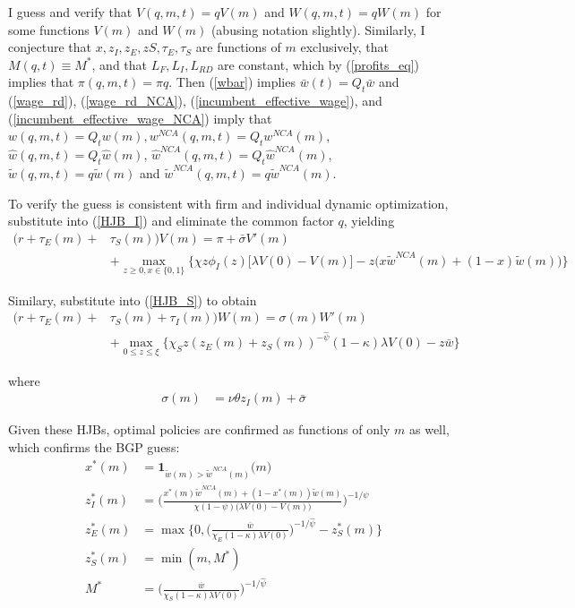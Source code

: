 \documentclass[12pt,english]{article}
\theoremstyle{remark}
\begin{document}
I guess and verify that $V(q,m,t) = q V(m)$ and $W(q,m,t) = qW(m)$ for some functions $V(m)$ and $W(m)$ (abusing notation slightly). Similarly, I conjecture that $x,z_I,z_E,zS,\tau_E,\tau_S$ are functions of $m$ exclusively, that $M(q,t) \equiv M^*$, and that $L_F,L_I,L_{RD}$ are constant, which by (\ref{profits_eq}) implies that $\pi(q,m,t) = \pi q$. Then (\ref{wbar}) implies $\bar{w}(t) = Q_t \bar{w}$ and (\ref{wage_rd}), (\ref{wage_rd_NCA}), (\ref{incumbent_effective_wage}), and (\ref{incumbent_effective_wage_NCA}) imply that $w(q,m,t) = Q_t w(m),w^{NCA}(q,m,t) = Q_tw^{NCA}(m)$, $\hat{w}(q,m,t) = Q_t \hat{w}(m)$, $\hat{w}^{NCA}(q,m,t) = Q_t \hat{w}^{NCA}(m)$, $\tilde{w}(q,m,t) = q \tilde{w}(m)$ and $\tilde{w}^{NCA}(q,m,t) = q\tilde{w}^{NCA}(m)$.

To verify the guess is consistent with firm and individual dynamic optimization, substitute into (\ref{HJB_I}) and eliminate the common factor $q$, yielding
\begin{align}
(r + \tau_E(m) + &\tau_S(m)) V(m) = \pi + \bar{\sigma}V'(m) \nonumber \\
&+ \max_{z \ge 0, x \in \{0,1\}} \Big\{  \chi z \phi_I(z) \Big[\lambda V(0) - V(m) \Big] - z \Big(x \tilde{w}^{NCA}(m) + (1-x) \tilde{w}(m) \Big) \Big\} \label{BGP_HJB_I}
\end{align} 

Similary, substitute into (\ref{HJB_S}) to obtain
\begin{align}
(r + \tau_E(m) + &\tau_S(m) + \tau_I(m))W(m) = \sigma(m) W'(m) \nonumber \\
&+ \max_{0 \le z \le \xi} \Big\{  \chi_S z (z_E(m) + z_S(m))^{-\hat{\psi}} (1-\kappa) \lambda V(0) - z \bar{w} \Big\} \label{BGP_HJB_S} 
\end{align}

where
\begin{align}
\sigma(m) &= \nu \theta z_I(m) + \bar{\sigma} 
\end{align}

Given these HJBs, optimal policies are confirmed as functions of only $m$ as well, which confirms the BGP guess:
\begin{align}
x^*(m) &= \textbf{1}_{\tilde{w}(m) > \tilde{w}^{NCA}(m)} \big(m\big) \\
z_I^*(m) &= \Bigg( \frac{x^*(m) \tilde{w}^{NCA}(m) + (1-x^*(m)) \tilde{w}(m)}{\chi (1-\psi) \Big(\lambda V(0) - V(m) \Big)} \Bigg)^{-1/\psi} \\
z_E^*(m) &= \max \Bigg\{0, \Big(\frac{\overline{w}}{\chi_E (1-\kappa) \lambda V(0)} \Big)^{-1 / \hat{\psi}} - z_S^*(m)\Bigg\} \\
z_S^*(m) &= \min(m,M^*) \\
M^* &= \Big(\frac{\overline{w}}{\chi_S (1-\kappa) \lambda V(0)} \Big)^{-1 / \hat{\psi}}
\end{align}
\end{document}
